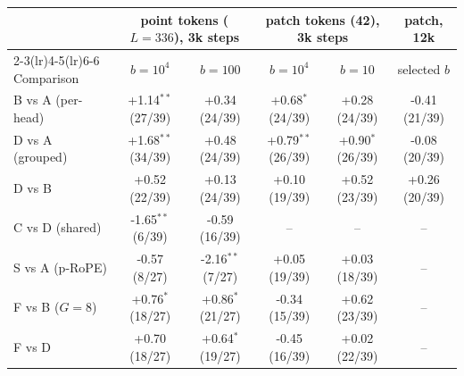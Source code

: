 \begin{tabular}{lccccc}
\toprule
 & \multicolumn{2}{c}{point tokens ($L{=}336$), 3k steps} & \multicolumn{2}{c}{patch tokens (42), 3k steps} & patch, 12k \\
\cmidrule(lr){2-3}\cmidrule(lr){4-5}\cmidrule(lr){6-6}
Comparison & $b=10^4$ & $b=100$ & $b=10^4$ & $b=10$ & selected $b$ \\
\midrule
B vs A (per-head) & +1.14$^{**}$ (27/39) & +0.34 (24/39) & +0.68$^{*}$ (24/39) & +0.28 (24/39) & -0.41 (21/39) \\
D vs A (grouped) & +1.68$^{**}$ (34/39) & +0.48 (24/39) & +0.79$^{**}$ (26/39) & +0.90$^{*}$ (26/39) & -0.08 (20/39) \\
D vs B & +0.52 (22/39) & +0.13 (24/39) & +0.10 (19/39) & +0.52 (23/39) & +0.26 (20/39) \\
C vs D (shared) & -1.65$^{**}$ (6/39) & -0.59 (16/39) & -- & -- & -- \\
S vs A (p-RoPE) & -0.57 (8/27) & -2.16$^{**}$ (7/27) & +0.05 (19/39) & +0.03 (18/39) & -- \\
F vs B ($G{=}8$) & +0.76$^{*}$ (18/27) & +0.86$^{*}$ (21/27) & -0.34 (15/39) & +0.62 (23/39) & -- \\
F vs D & +0.70 (18/27) & +0.64$^{*}$ (19/27) & -0.45 (16/39) & +0.02 (22/39) & -- \\
\bottomrule
\end{tabular}
